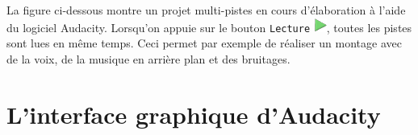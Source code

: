 La figure ci-dessous montre un projet multi-pistes en cours d'élaboration à l'aide du logiciel Audacity. Lorsqu'on appuie sur le bouton \texttt{Lecture} \includegraphics[width=.4cm]{./images/son01/boutonPlay}, toutes les pistes sont lues en même temps. Ceci permet par exemple de réaliser un montage avec de la voix, de la musique en arrière plan et des bruitages.




\section{L'interface graphique d'Audacity}\label{Son1Interface}

